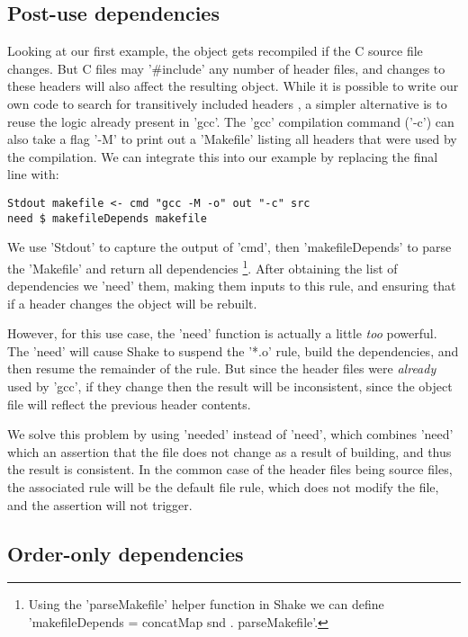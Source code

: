 \subsection{Post-use dependencies\label{sec:needed}}

Looking at our first example, the object gets recompiled if the C source file
changes. But C files may \lst'#include' any number of header files, and changes
to these headers will also affect the resulting object. While it is possible to
write our own code to search for transitively included headers
\cite[\S6.4]{shake}, a simpler alternative is to reuse the logic already present
in \lst'gcc'. The \lst'gcc' compilation command (\lst'-c') can also take a flag
\lst'-M' to print out a \lst'Makefile' listing all headers that were used by the
compilation. We can integrate this into our example by replacing the final
line with:

\begin{lstlisting}
Stdout makefile <- cmd "gcc -M -o" out "-c" src
need $ makefileDepends makefile
\end{lstlisting}

\noindent We use \lst'Stdout' to capture the output of \lst'cmd', then
\lst'makefileDepends' to parse the \lst'Makefile' and return all dependencies
\footnote{Using the \lst'parseMakefile' helper function in Shake we can define
\lst'makefileDepends = concatMap snd . parseMakefile'.}. After obtaining the
list of dependencies we \lst'need' them, making them inputs to this rule, and
ensuring that if a header changes the object will be rebuilt.

However, for this use case, the \lst'need' function is actually a little
\emph{too} powerful. The \lst'need' will cause Shake to suspend the \lst'*.o'
rule, build the dependencies, and then resume the remainder of the rule. But
since the header files were \emph{already} used by \lst'gcc', if they change
then the result will be inconsistent, since the object file will reflect the
previous header contents.

We solve this problem by using \lst'needed' instead of \lst'need', which
combines \lst'need' which an assertion that the file does not change as a result
of building, and thus the result is consistent. In the common case of the header
files being source files, the associated rule will be the default file rule,
which does not modify the file, and the assertion will not trigger.

\subsection{Order-only dependencies}

